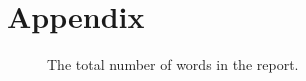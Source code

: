 \documentclass[letterpaper, 10 pt, conference]{ieeeconf}  %
\begin{document}
\clearpage 




\section{Appendix}
\begin{figure}[!htb]
        \caption{\label{fig:my-label} The total number of words in the report.}
\end{figure}
\end{document}
